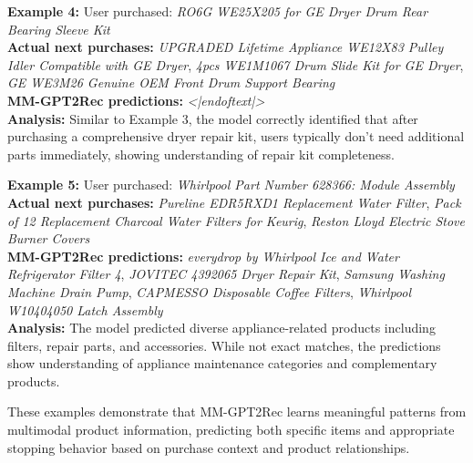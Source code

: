 \documentclass[conference]{IEEEtran}
\begin{document}
\textbf{Example 4:} User purchased: \textit{RO6G WE25X205 for GE Dryer Drum Rear Bearing Sleeve Kit} \\
\textbf{Actual next purchases:} \textit{UPGRADED Lifetime Appliance WE12X83 Pulley Idler Compatible with GE Dryer}, \textit{4pcs WE1M1067 Drum Slide Kit for GE Dryer}, \textit{GE WE3M26 Genuine OEM Front Drum Support Bearing} \\
\textbf{MM-GPT2Rec predictions:} \textit{<|endoftext|>} \\
\textbf{Analysis:} Similar to Example 3, the model correctly identified that after purchasing a comprehensive dryer repair kit, users typically don't need additional parts immediately, showing understanding of repair kit completeness.

\textbf{Example 5:} User purchased: \textit{Whirlpool Part Number 628366: Module Assembly} \\
\textbf{Actual next purchases:} \textit{Pureline EDR5RXD1 Replacement Water Filter}, \textit{Pack of 12 Replacement Charcoal Water Filters for Keurig}, \textit{Reston Lloyd Electric Stove Burner Covers} \\
\textbf{MM-GPT2Rec predictions:} \textit{everydrop by Whirlpool Ice and Water Refrigerator Filter 4}, \textit{JOVITEC 4392065 Dryer Repair Kit}, \textit{Samsung Washing Machine Drain Pump}, \textit{CAPMESSO Disposable Coffee Filters}, \textit{Whirlpool W10404050 Latch Assembly} \\
\textbf{Analysis:} The model predicted diverse appliance-related products including filters, repair parts, and accessories. While not exact matches, the predictions show understanding of appliance maintenance categories and complementary products.

These examples demonstrate that MM-GPT2Rec learns meaningful patterns from multimodal product information, predicting both specific items and appropriate stopping behavior based on purchase context and product relationships.
\end{document}
